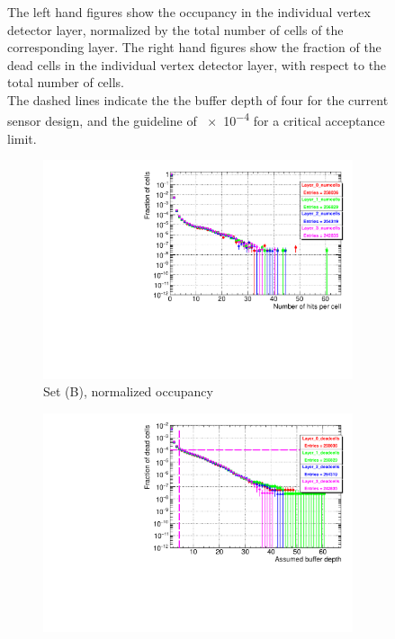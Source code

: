 \begin{figure}[!htbp]
{   The left hand figures show the occupancy in the individual vertex detector layer, normalized by the total number of cells of the corresponding layer.
   The right hand figures show the fraction of the dead cells in the individual vertex detector layer, with respect to the total number of cells.
   \\The dashed lines indicate the the buffer depth of four for the current sensor design, and the guideline of \num{e-4} for a critical acceptance limit.
   }
   \label{fig:PairBkg:ILC250_Occupancy_Layers_VXDEndcap}
  \end{figure}
  \begin{figure}[htb]\ContinuedFloat
     \begin{subfigure}[b]{0.49\textwidth}
   \centering
    \includegraphics[width=\textwidth]{Figures/Pairs/Appendix/occupancy_numcells_SiVertexEndcap_ILC250_SetB.pdf}
   \caption{Set (B), normalized occupancy}
   \end{subfigure}
   \hfill
    \begin{subfigure}[b]{0.49\textwidth}
   \centering
    \includegraphics[width=\textwidth]{Figures/Pairs/Appendix/occupancy_deadcells_SiVertexEndcap_ILC250_SetB.pdf}

\end{subfigure}
\end{figure}
